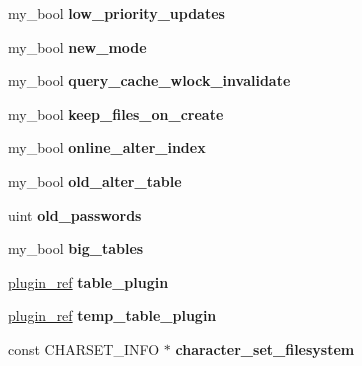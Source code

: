 \begin{DoxyCompactItemize}
my\+\_\+bool {\bfseries low\+\_\+priority\+\_\+updates}
\item 
\mbox{\label{structsystem__variables_a287fbecc9d5af79b7d78089cd5b739f2}} 
my\+\_\+bool {\bfseries new\+\_\+mode}
\item 
\mbox{\label{structsystem__variables_a0f78552e43464b631c7d444f01dcae65}} 
my\+\_\+bool {\bfseries query\+\_\+cache\+\_\+wlock\+\_\+invalidate}
\item 
\mbox{\label{structsystem__variables_abadd407e6677197f4197b89ebb043d33}} 
my\+\_\+bool {\bfseries keep\+\_\+files\+\_\+on\+\_\+create}
\item 
\mbox{\label{structsystem__variables_a28f46530a7277dcb37263731e634d3b9}} 
my\+\_\+bool {\bfseries online\+\_\+alter\+\_\+index}
\item 
\mbox{\label{structsystem__variables_acc2896a32c603fba43e122d9842ff22c}} 
my\+\_\+bool {\bfseries old\+\_\+alter\+\_\+table}
\item 
\mbox{\label{structsystem__variables_a36f5d44477ad67924f4b65f4412e1966}} 
uint {\bfseries old\+\_\+passwords}
\item 
\mbox{\label{structsystem__variables_a42cbed4e8e2932090a87e5ac33ec9679}} 
my\+\_\+bool {\bfseries big\+\_\+tables}
\item 
\mbox{\label{structsystem__variables_aad1ea2ab8cdcf08f2f0b24a83b67afa1}} 
\mbox{\hyperlink{structst__plugin__int}{plugin\+\_\+ref}} {\bfseries table\+\_\+plugin}
\item 
\mbox{\label{structsystem__variables_a0b94d0044b8526e8d9851e0829b71bf9}} 
\mbox{\hyperlink{structst__plugin__int}{plugin\+\_\+ref}} {\bfseries temp\+\_\+table\+\_\+plugin}
\item 
\mbox{\label{structsystem__variables_a7d65d40bf8405845923b850134dd4483}} 
const C\+H\+A\+R\+S\+E\+T\+\_\+\+I\+N\+FO $\ast$ {\bfseries character\+\_\+set\+\_\+filesystem}

\end{DoxyCompactItemize}
